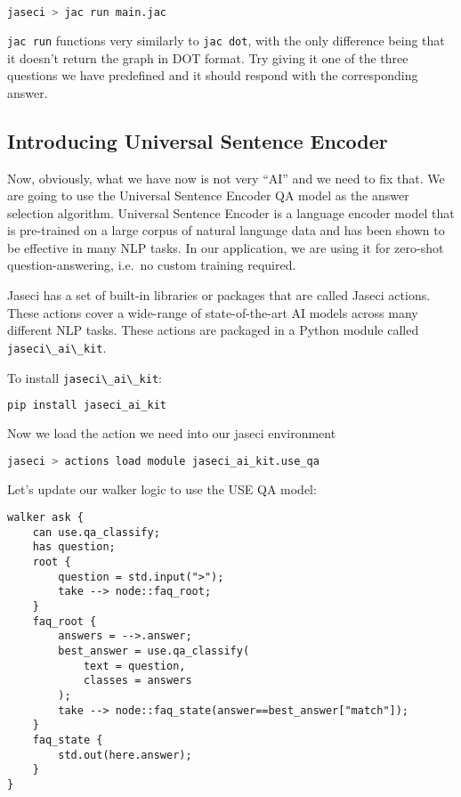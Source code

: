 \begin{lstlisting}[language=bash]
jaseci > jac run main.jac
\end{lstlisting}

\passthrough{\lstinline!jac run!} functions very similarly to
\passthrough{\lstinline!jac dot!}, with the only difference being that
it doesn't return the graph in DOT format. Try giving it one of the
three questions we have predefined and it should respond with the
corresponding answer.

\hypertarget{introducing-universal-sentence-encoder}{%
\subsection{Introducing Universal Sentence
Encoder}\label{introducing-universal-sentence-encoder}}

Now, obviously, what we have now is not very ``AI'' and we need to fix
that. We are going to use the Universal Sentence Encoder QA model as the
answer selection algorithm. Universal Sentence Encoder is a language
encoder model that is pre-trained on a large corpus of natural language
data and has been shown to be effective in many NLP tasks. In our
application, we are using it for zero-shot question-answering, i.e.~no
custom training required.

Jaseci has a set of built-in libraries or packages that are called
Jaseci actions. These actions cover a wide-range of state-of-the-art AI
models across many different NLP tasks. These actions are packaged in a
Python module called \passthrough{\lstinline!jaseci\_ai\_kit!}.

To install \passthrough{\lstinline!jaseci\_ai\_kit!}:

\begin{lstlisting}[language=bash]
pip install jaseci_ai_kit
\end{lstlisting}

Now we load the action we need into our jaseci environment

\begin{lstlisting}[language=bash]
jaseci > actions load module jaseci_ai_kit.use_qa
\end{lstlisting}

Let's update our walker logic to use the USE QA model:

\begin{lstlisting}
walker ask {
    can use.qa_classify;
    has question;
    root {
        question = std.input(">");
        take --> node::faq_root;
    }
    faq_root {
        answers = -->.answer;
        best_answer = use.qa_classify(
            text = question,
            classes = answers
        );
        take --> node::faq_state(answer==best_answer["match"]);
    }
    faq_state {
        std.out(here.answer);
    }
}
\end{lstlisting}

